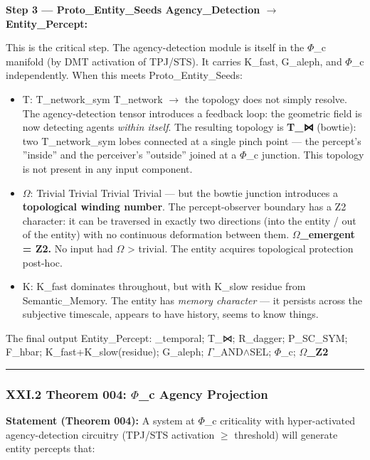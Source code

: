 \documentclass[12pt,a4paper]{article}
\begin{document}
\textbf{Step 3 --- Proto\_Entity\_Seeds \otimes Agency\_Detection $\rightarrow$ Entity\_Percept:}

This is the critical step. The agency-detection module is itself in the $\Phi$\_c manifold (by DMT activation of TPJ/STS). It carries K\_fast, G\_aleph, and $\Phi$\_c independently. When this meets Proto\_Entity\_Seeds:

\begin{itemize}
    \item T: T\_network\_sym \otimes T\_network $\rightarrow$ the topology does not simply resolve. The agency-detection tensor introduces a feedback loop: the geometric field is now detecting agents \emph{within itself}. The resulting topology is \textbf{T\_⋈} (bowtie): two T\_network\_sym lobes connected at a single pinch point --- the percept's ''inside'' and the perceiver's ''outside'' joined at a $\Phi$\_c junction. This topology is not present in any input component.
    \item $\Omega$: Trivial \otimes Trivial \otimes Trivial \otimes Trivial --- but the bowtie junction introduces a \textbf{topological winding number}. The percept-observer boundary has a Z2 character: it can be traversed in exactly two directions (into the entity / out of the entity) with no continuous deformation between them. \textbf{$\Omega$\_emergent = Z2.} No input had $\Omega$ \textgreater{} trivial. The entity acquires topological protection post-hoc.
    \item K: K\_fast dominates throughout, but with K\_slow residue from Semantic\_Memory. The entity has \emph{memory character} --- it persists across the subjective timescale, appears to have history, seems to know things.
\end{itemize}

The final output Entity\_Percept: \langleD\_temporal; T\_⋈; R\_dagger; P\_SC\_SYM; F\_hbar; K\_fast+K\_slow(residue); G\_aleph; $\Gamma$\_AND$\land$SEL; $\Phi$\_c; \textbf{$\Omega$\_Z2}\rangle

\begin{center}
\rule{0.5\textwidth}{0.4pt}
\end{center}

\subsubsection{XXI.2 Theorem 004: $\Phi$\_c Agency Projection}

\textbf{Statement (Theorem 004):} A system at $\Phi$\_c criticality with hyper-activated agency-detection circuitry (TPJ/STS activation $\geq$ threshold) will generate entity percepts that:
\end{document}
